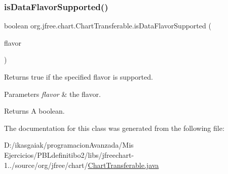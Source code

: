 \subsubsection{\texorpdfstring{is\+Data\+Flavor\+Supported()}{isDataFlavorSupported()}}
{\footnotesize\ttfamily boolean org.\+jfree.\+chart.\+Chart\+Transferable.\+is\+Data\+Flavor\+Supported (\begin{DoxyParamCaption}\item[{Data\+Flavor}]{flavor }\end{DoxyParamCaption})}

Returns {\ttfamily true} if the specified flavor is supported.


\begin{DoxyParams}{Parameters}
{\em flavor} & the flavor.\\
\hline
\end{DoxyParams}
\begin{DoxyReturn}{Returns}
A boolean. 
\end{DoxyReturn}


The documentation for this class was generated from the following file\+:\begin{DoxyCompactItemize}
\item 
D\+:/ikasgaiak/programacion\+Avanzada/\+Mis Ejercicios/\+P\+B\+Ldefinitibo2/libs/jfreechart-\/1../source/org/jfree/chart/\mbox{\hyperlink{_chart_transferable_8java}{Chart\+Transferable.\+java}}\end{DoxyCompactItemize}
